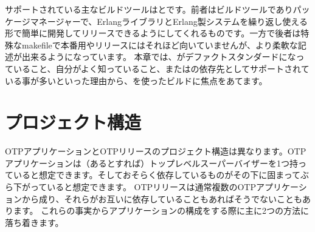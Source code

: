 サポートされている主なビルドツールはとです。前者はビルドツールでありパッケージマネージャーで、ErlangライブラリとErlang製システムを繰り返し使える形で簡単に開発してリリースできるようにしてくれるものです。一方で後者は特殊なmakefileで本番用やリリースにはそれほど向いていませんが、より柔軟な記述が出来るようになっています。
本章では、がデファクトスタンダードになっていること、自分がよく知っていること、またはの依存先としてサポートされている事が多いといった理由から、を使ったビルドに焦点をあてます。

\section{プロジェクト構造}
\label{sec:project-structure}

OTPアプリケーションとOTPリリースのプロジェクト構造は異なります。OTPアプリケーションは（あるとすれば）トップレベルスーパーバイザーを1つ持っていると想定できます。そしておそらく依存しているものがその下に固まってぶら下がっていると想定できます。
OTPリリースは通常複数のOTPアプリケーションから成り、それらがお互いに依存していることもあればそうでないこともあります。
これらの事実からアプリケーションの構成をする際に主に2つの方法に落ち着きます。

